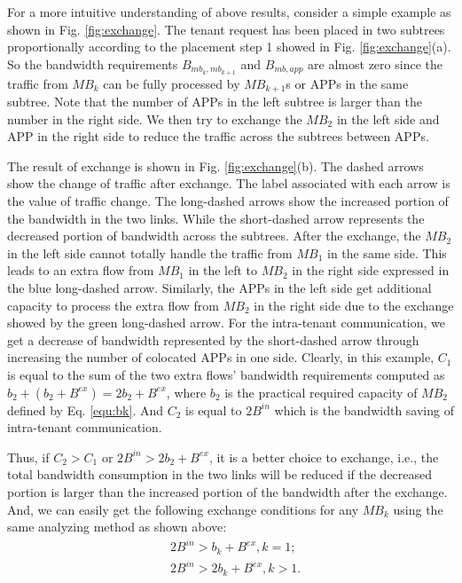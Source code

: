 \documentclass[review]{elsarticle}
\begin{document}
For a more intuitive understanding of above results, consider a simple example as shown in Fig. \ref{fig:exchange}. The tenant request has been placed in two subtrees proportionally according to the placement step 1 showed in Fig. \ref{fig:exchange}(a). So the bandwidth requirements $B_{mb_k,mb_{k+1}}$ and $B_{mb,app}$ are almost zero since the traffic from $MB_k$ can be fully processed by $MB_{k+1}$s or APPs in the same subtree. Note that the number of APPs in the left subtree is larger than the number in the right side. We then try to exchange the $MB_2$ in the left side and APP in the right side to reduce the traffic across the subtrees between APPs. 

The result of exchange is shown in Fig. \ref{fig:exchange}(b). The dashed arrows show the change of traffic after exchange. The label associated with each arrow is the value of traffic change. %
 The long-dashed arrows show the increased portion of the bandwidth in the two links. While the short-dashed arrow represents the decreased portion of bandwidth across the subtrees. After the exchange, the $MB_2$ in the left side cannot totally handle the traffic from $MB_1$ in the same side. This leads to an extra flow from $MB_1$ in the left to $MB_2$ in the right side expressed in the blue long-dashed arrow. Similarly, the APPs in the left side get additional capacity to process the extra flow from $MB_2$ in the right side due to the exchange showed by the green long-dashed arrow. For the intra-tenant communication, we get a decrease of bandwidth represented by the short-dashed arrow through increasing the number of colocated APPs in one side. Clearly, in this example, $C_1$ is equal to the sum of the two extra flows' bandwidth requirements computed as $b_2+(b_2+B^{ex})=2b_2+B^{ex}$, where $b_2$ is the practical required capacity of $MB_2$ defined by Eq. \ref{equ:bk}. And $C_2$ is equal to $2B^{in}$ which is the bandwidth saving of intra-tenant communication. 

Thus, if $C_2>C_1$ or $2B^{in} > 2b_2 + B^{ex}$, it is a better choice to exchange, i.e., the total bandwidth consumption in the two links will be reduced if the decreased portion is larger than the increased portion of the bandwidth after the exchange. And, we can easily get the following exchange conditions for any $MB_k$ using the same analyzing method as shown above: 
\begin{equation}
\begin{aligned}
&2B^{in}>b_k+B^{ex},k=1;\\
&2B^{in}>2b_k+B^{ex},k>1.
\end{aligned}
\end{equation}
\end{document}
